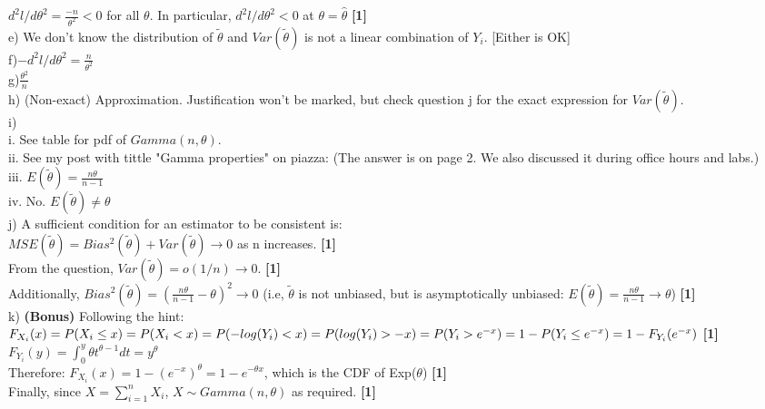 \documentclass[20pt]{report}
\newcommand{\gt}{\theta}
\newcommand{\ttil}{\tilde{\theta}}
\begin{document}
$
d^2l/d\theta^2 = \frac{-n}{\theta^2} <0
$ for all $\theta$. In particular, $d^2l/d\theta^2 < 0$ at $\theta = \hat{\theta} $ \textbf{[1] }\\

e) We don't know the distribution of $\tilde{\theta} $ and
$Var(\tilde{\theta})$ is not a linear combination of $Y_i$. [Either is OK] \\

f)$
- d^2l/d\theta^2 = \frac{n}{\theta^2} 
$ \\

g)$
\frac{\theta^2}{n}
$ \\

h) (Non-exact) Approximation. Justification won't be marked, but check question j for the exact expression for $Var(\tilde{\theta})$. \\

i)\\ 

i. See table for pdf of $Gamma(n,\theta)$. \\

ii. See my post with tittle "Gamma properties" on piazza: (The answer is on page 2. We also discussed it during office hours and labs.)\\

iii. $E(\ttil) = \frac{n\gt}{n-1}$ \\

iv. No. $E(\ttil) \neq \theta $ \\


j) A sufficient condition for an estimator to be consistent is: \\

$
MSE(\ttil) = Bias^2(\ttil) + Var(\ttil) \rightarrow 0
$ as n increases. \textbf{[1]} \\

From the question, $ Var(\ttil) = o(1/n) \rightarrow 0 $. \textbf{[1]} \\

Additionally, $ Bias^2(\ttil)= (\frac{n\gt}{n-1} - \theta)^2 \rightarrow 0 $ 
(i.e, $\ttil$ is not unbiased, but is asymptotically unbiased: $ E(\ttil) = \frac{n\gt}{n-1} \rightarrow \theta$) \textbf{[1]} \\

k) \textbf{(Bonus)} Following the hint: \\

$F_{X_i}(x) = P(X_i \leq x) = P (X_i < x) = P(-log(Y_i) < x) = P(log(Y_i) > -x) = 
P(Y_i > e^{-x}) = \\ 1 - P(Y_i \leq e^{-x}) = 1 - F_{Y_i} (e^{-x})$ \textbf{[1]} \\

$ F_{Y_i}(y) = \int_0^y \theta t^{\theta-1} dt =  y^\theta
$ \\

Therefore:
$ F_{X_i}(x) = 1 - (e^{-x}) ^\theta = 
1 - e^{-\theta x} $, which is the CDF of Exp($\theta$) \textbf{[1]} \\

Finally, since $X = \sum_{i=1}^n X_i$, $X \sim Gamma(n,\theta)$ as required. \textbf{[1]}
\end{document}
